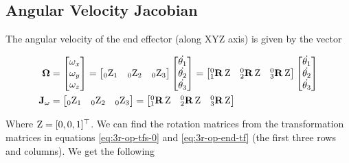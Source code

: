 \subsection{Angular Velocity Jacobian}

The angular velocity of the end effector (along XYZ axis) is given by the vector

\begin{align}
    \mathbf{\Omega} &= \begin{bmatrix}
        \omega_x \\ \omega_y \\ \omega_z
        \end{bmatrix} = \begin{bmatrix}
        _0\textup{Z}_1 & _0\textup{Z}_2 & _0\textup{Z}_3
        \end{bmatrix} \begin{bmatrix}
        \dot{\theta_1} \\ \dot{\theta_2} \\ \dot{\theta_3}
        \end{bmatrix} = \begin{bmatrix}
        ^0_1\mathbf{R} \, \textup{Z} & ^0_2\mathbf{R} \, \textup{Z} & ^0_3\mathbf{R} \, \textup{Z}
        \end{bmatrix} \begin{bmatrix}
        \dot{\theta_1} \\ \dot{\theta_2} \\ \dot{\theta_3}
        \end{bmatrix}
    \nonumber \\
    \mathbf{J_\omega} &= \begin{bmatrix}
        _0\textup{Z}_1 & _0\textup{Z}_2 & _0\textup{Z}_3
        \end{bmatrix} = \begin{bmatrix}
        ^0_1\mathbf{R} \, \textup{Z} & ^0_2\mathbf{R} \, \textup{Z} & ^0_3\mathbf{R} \, \textup{Z}
        \end{bmatrix}
    \label{eq:3r-op-jw-raw}
\end{align}

Where $\textup{Z} = [0, 0, 1]^\top$. We can find the rotation matrices from the transformation matrices in equations \ref{eq:3r-op-tfs-0} and \ref{eq:3r-op-end-tf} (the first three rows and columns). We get the following


